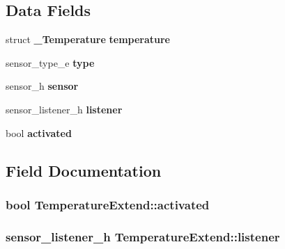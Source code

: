\subsection*{Data Fields}
\begin{DoxyCompactItemize}
\item 
struct {\bf \-\_\-\-Temperature} {\bfseries temperature}\label{structTemperatureExtend_a1945df07e1b14c53da9611270750d998}

\item 
sensor\-\_\-type\-\_\-e {\bfseries type}\label{structTemperatureExtend_a93ba9f143fec00e4b5dcfd612b28ad3e}

\item 
sensor\-\_\-h {\bfseries sensor}\label{structTemperatureExtend_ac34db86753df4d8667cdaf60133e4321}

\item 
sensor\-\_\-listener\-\_\-h {\bfseries listener}\label{structTemperatureExtend_a003c95e45217ac19152afdb802b5d4ec}

\item 
bool {\bfseries activated}\label{structTemperatureExtend_aa5f1f63deee1974aa985d881127c1ce4}

\end{DoxyCompactItemize}


\subsection{Field Documentation}
\subsubsection[{activated}]{\setlength{\rightskip}{0pt plus 5cm}bool Temperature\-Extend\-::activated}\label{structTemperatureExtend_aa5f1f63deee1974aa985d881127c1ce4}
\subsubsection[{listener}]{\setlength{\rightskip}{0pt plus 5cm}sensor\-\_\-listener\-\_\-h Temperature\-Extend\-::listener}\label{structTemperatureExtend_a003c95e45217ac19152afdb802b5d4ec}
